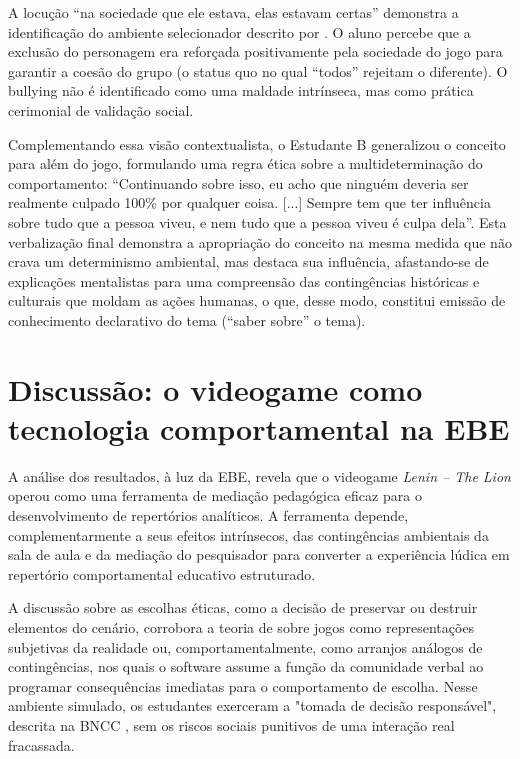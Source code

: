 \documentclass[portuguese]{textolivre}
\begin{document}
A locução “na sociedade que ele estava, elas estavam certas” demonstra a identificação do ambiente selecionador descrito por \textcite{todorov2004analise}. O aluno percebe que a exclusão do personagem era reforçada positivamente pela sociedade do jogo para garantir a coesão do grupo (o status quo no qual “todos” rejeitam o diferente). O bullying não é identificado como uma maldade intrínseca, mas como prática cerimonial de validação social.

Complementando essa visão contextualista, o Estudante B generalizou o conceito para além do jogo, formulando uma regra ética sobre a multideterminação do comportamento: “Continuando sobre isso, eu acho que ninguém deveria ser realmente culpado 100\% por qualquer coisa. [...] Sempre tem que ter influência sobre tudo que a pessoa viveu, e nem tudo que a pessoa viveu é culpa dela”. Esta verbalização final demonstra a apropriação do conceito na mesma medida que não crava um determinismo ambiental, mas destaca sua influência, afastando-se de explicações mentalistas para uma compreensão das contingências históricas e culturais que moldam as ações humanas, o que, desse modo, constitui emissão de conhecimento declarativo do tema (“saber sobre” o tema).

\section{Discussão: o videogame como tecnologia comportamental na EBE}

A análise dos resultados, à luz da EBE, revela que o videogame \textit{Lenin – The Lion} operou como uma ferramenta de mediação pedagógica eficaz para o desenvolvimento de repertórios analíticos. A ferramenta depende, complementarmente a seus efeitos intrínsecos, das contingências ambientais da sala de aula e da mediação do pesquisador para converter a experiência lúdica em repertório comportamental educativo estruturado.

A discussão sobre as escolhas éticas, como a decisão de preservar ou destruir elementos do cenário, corrobora a teoria de \textcite{crawford1984art} sobre jogos como representações subjetivas da realidade ou, comportamentalmente, como arranjos análogos de contingências, nos quais o software assume a função da comunidade verbal ao programar consequências imediatas para o comportamento de escolha. Nesse ambiente simulado, os estudantes exerceram a "tomada de decisão responsável", descrita na BNCC \cite{brasil2018bncc}, sem os riscos sociais punitivos de uma interação real fracassada.
\end{document}
